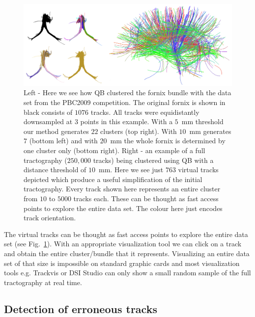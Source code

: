 \documentclass[preprint,authoryear,a4paper,10pt,onecolumn]{elsarticle}
\begin{document}
\begin{figure}
\begin{centering}
\includegraphics[scale=0.6]{last_figures/LSC_simple}
\par\end{centering}
\caption{Left - Here we see how QB clustered the fornix bundle with the
  data set from the PBC2009 competition. The original fornix is shown in
  black consists of $1076$ tracks. All tracks were equidistantly
  downsampled at $3$ points in this example. With a $5$~mm threshold our
  method generates $22$ clusters (top right). With $10$~mm generates $7$
  (bottom left) and with $20$~mm the whole fornix is determined by one
  cluster only (bottom right). Right - an example of a full tractography
  ($250,000$ tracks) being clustered using QB with a distance threshold
  of $10$~mm. Here we see just $763$ virtual tracks depicted which
  produce a useful simplification of the initial tractography. Every
  track shown here represents an entire cluster from $10$ to $5000$
  tracks each. These can be thought as fast access points to explore the
  entire data set. The colour here just encodes track
  orientation.\label{Flo:QB_fornix}}
\centering{}
\end{figure}

The virtual tracks can be thought as fast access points to explore the
entire data set (see Fig.~\ref{Flo:QB_fornix}). With an appropriate
visualization tool we can click on a track and obtain the entire
cluster/bundle that it represents. Visualizing an entire data set of
that size is impossible on standard graphic cards and most visualization
tools e.g. Trackvis or DSI Studio can only show a small random sample of
the full tractography at real time.

\subsection{Detection of erroneous tracks\label{sub:erroneous}}
\end{document}
